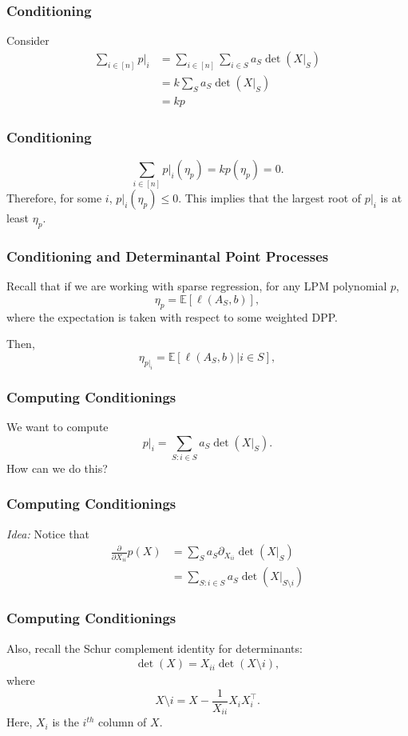 \documentclass{beamer}
\newcommand{\E}{\mathbb{E}}
\begin{document}
\begin{frame}
    \frametitle{Conditioning}
    Consider
        \begin{align*} 
        \sum_{i \in [n]} p|_{i}&=\sum_{i \in [n]} \sum_{i \in  S} a_S \det(X|_S)\\
                &=k\sum_{S} a_S \det(X|_S)\\
                &=kp
        \end{align*}
\end{frame}
\begin{frame}
    \frametitle{Conditioning}
    \[
        \sum_{i\in [n]}p|_i(\eta_p) = kp(\eta_p) = 0.
    \]
    \pause
    Therefore, for some $i$, $ p|_{i}(\eta_{p}) \le 0$.
    \pause
    This implies that the largest root of $p|_{i}$ is at least $\eta_{p}$.
\end{frame}
\begin{frame}
    \frametitle{Conditioning and Determinantal Point Processes}
    Recall that if we are working with sparse regression, for any LPM polynomial $p$,
    \[
        \eta_p = \E[\ell(A_S, b)],
    \]
    where the expectation is taken with respect to some weighted DPP.

    Then,
    \[
        \eta_{p|_i} = \E[\ell(A_S, b)|i \in S],
    \]
\end{frame}
\begin{frame}
    \frametitle{Computing Conditionings}
    We want to compute
    \[
        p|_i = \sum_{S : i \in S} a_S \det(X|_S).
    \]
    How can we do this?
\end{frame}
\begin{frame}
    \frametitle{Computing Conditionings}
    \emph{Idea: } Notice that
    \begin{align*}
        \frac{\partial}{\partial X_{ii}} p(X) &= \sum_{S} a_S \partial_{X_{ii}} \det(X|_{S})\\
                               &= \sum_{S : i \in S} a_S \det(X|_{S \setminus i})
    \end{align*}
\end{frame}
\begin{frame}
    \frametitle{Computing Conditionings}
    Also, recall the Schur complement identity for determinants:
    \begin{align*}
        \det(X) = X_{ii} \det(X \setminus i),
    \end{align*}
    where 
    \[
        X \setminus i = X - \frac{1}{X_{ii}} X_i X_i^{\intercal}.
    \]
    Here, $X_i$ is the $i^{th}$ column of $X$.
\end{frame}
\end{document}
